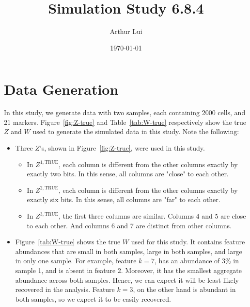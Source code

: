 \documentclass[10pt]{article} %
\title{Simulation Study 6.8.4}
\author{Arthur Lui}
\date{\today} %
\def\true{\text{TRUE}}
\begin{document}
\maketitle



\section{Data Generation}\label{sec:data-generation}
In this study, we generate data with two samples, each containing 2000 cells,
and 21 markers. Figure~\ref{fig:Z-true} and Table~\ref{tab:W-true}
respectively show the true $Z$ and $W$ used to generate the simulated data in
this study. Note the following:
\begin{itemize}
  \item Three $Z$'s, shown in Figure~\ref{fig:Z-true}, were used in this study.
  \begin{itemize}
    \item In $Z^{1,\true}$, each column is different from the other columns exactly
    by exactly two bits. In this sense, all columns are "close" to each
    other.
    \item In $Z^{2,\true}$, each column is different from the other columns exactly
    by exactly six bits. In this sense, all columns are "far" to each
    other.
    \item In $Z^{3,\true}$, the first three columns are similar. Columns 4 and 5 are 
    close to each other. And columns 6 and 7 are distinct from other columns. 
  \end{itemize}
  \item Figure~\ref{tab:W-true} shows the true $W$ used for this study. It
    contains feature abundances that are small in both samples, large in both
    samples, and large in only one sample. For example, feature $k=7$, 
    has an abundance of $3\%$ in sample 1, and is absent in feature 2. 
    Moreover, it has the smallest aggregate abundance across both samples. 
    Hence, we can expect it will be least likely recovered in the analysis. 
    Feature $k=3$, on the other hand is abundant in both samples, so we expect
    it to be easily recovered.
\end{itemize}
\end{document}
